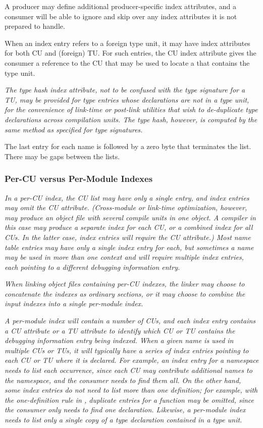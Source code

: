 A producer may define additional 
\bb
producer-specific 
index attributes, 
\eb
and a consumer will be able to ignore and skip over any 
\bb
index attributes 
\eb
it is not prepared to handle.

When an index entry refers to a foreign type unit, it may have
\bb
index attributes 
\eb
for both CU and (foreign) TU. For such entries, the CU
\bb
index attribute
\eb
gives the consumer a reference to the CU that may be used to
locate a \splitDWARFobjectfile{} that contains the type unit.

\textit{The type hash
\bb
index attribute, 
\eb
not to be confused with the type signature
for a TU, may be provided for type entries whose declarations are not
in a type unit, for the convenience of link-time or post-link
utilities that wish to de-duplicate type declarations across
compilation units. The type hash, however, is computed by the
same method as specified for type signatures.}

The last entry for each name is followed by a zero byte that
terminates the list. There may be gaps between the lists.

\subsubsection{Per-CU versus Per-Module Indexes}
\label{chap:percuvspermoduleindexes}
\textit{In a per-CU index, the CU list may have only a single entry, 
and index entries may omit the CU 
\bb
attribute. 
\eb
(Cross-module or link-time
optimization, however, may produce an object file with several compile
units in one object. A compiler in this case may produce a separate
index for each CU, or a combined index for all CUs. In the latter
case, index entries will require the CU
\bb
attribute.) 
\eb
Most name table
entries may have only a single index entry for each, but sometimes a
name may be used in more than one context and will require multiple
index entries, each pointing to a different debugging information
entry.}

\textit{When linking object files containing per-CU indexes, the 
linker may choose to concatenate the indexes as ordinary sections, 
or it may choose to combine the input indexes into a single 
per-module index.}

\textit{A per-module index will contain a number of CUs, and each index 
entry contains a CU attribute or a TU attribute to identify which 
CU or TU contains the debugging information entry being indexed. When a
given name is used in multiple CUs or TUs, it will typically have a
series of index entries pointing to each CU or TU where it is declared. 
For example, an index entry for a  namespace needs to
list each occurrence, since each CU may contribute additional names to
the namespace, and the consumer needs to find them all. On the
other hand, some index entries do not need to list more than one
definition; for example, with the one-definition rule in ,
duplicate entries for a function may be omitted, since the consumer
only needs to find one declaration. Likewise, a per-module index needs
to list only a single copy of a type declaration contained in a type
unit.}


